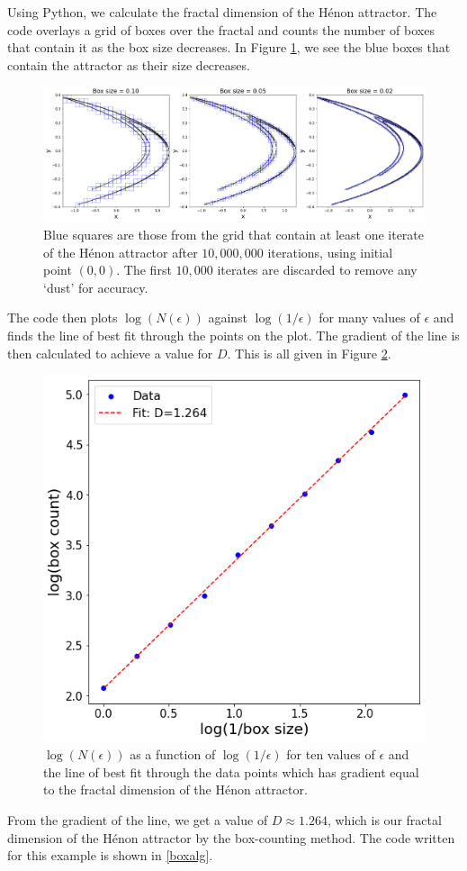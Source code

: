 \begin{exmp}
    Using Python, we calculate the fractal dimension of the Hénon attractor. The code overlays a grid of boxes over the fractal and counts the number of boxes that contain it as the box size decreases. In Figure \ref{fig:Henon4}, we see the blue boxes that contain the attractor as their size decreases.
    \begin{figure}
        \centering
        \includegraphics[width=1\linewidth]{Images/Henon boxes.png}
        \caption{Blue squares are those from the grid that contain at least one iterate of the Hénon attractor after $10,000,000$ iterations, using initial point $(0,0)$. The first $10,000$ iterates are discarded to remove any `dust' for accuracy.}
        \label{fig:Henon4}
    \end{figure}
    The code then plots $\log (N(\epsilon))$ against $\log (1/\epsilon)$ for many values of $\epsilon$ and finds the line of best fit through the points on the plot. The gradient of the line is then calculated to achieve a value for $D$. This is all given in Figure \ref{fig:Henon5}.
    \begin{figure}
        \centering
        \includegraphics[width=0.5\linewidth]{Images/henon loglog.png}
        \caption{$\log (N(\epsilon))$ as a function of $\log(1/\epsilon)$ for ten values of $\epsilon$ and the line of best fit through the data points which has gradient equal to the fractal dimension of the Hénon attractor.}
        \label{fig:Henon5}
    \end{figure}
    From the gradient of the line, we get a value of $D\approx1.264$, which is our fractal dimension of the Hénon attractor by the box-counting method. The code written for this example is shown in \ref{boxalg}.
\end{exmp}
